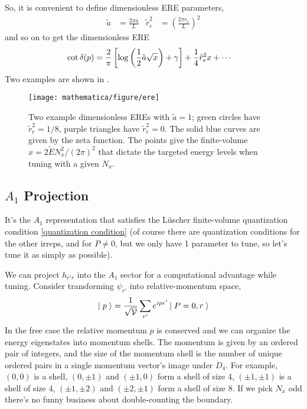 So, it is convenient to define dimensionless ERE parameters,
\begin{align}
    \tilde{a} &= \frac{2 \pi a}{L}
    &
    \tilde{r}_e^2 &= \left(\frac{2 \pi r_e}{L}\right)^2
\end{align}
and so on to get the dimensionless ERE
\begin{align}
    \cot \delta(p)
    &=
	\frac{2}{\pi}\left[ \log\left(\frac{1}{2} \tilde{a} \sqrt{x}\right)+ \gamma\right]
    +
	\frac{1}{4} \tilde{r}_e^2 x
    +
    \cdots
    \label{eq:ere dimensionless}
\end{align}
Two examples are shown in .

\begin{figure}
	\texttt{[image: mathematica/figure/ere]}
	\caption{
		Two example dimensionless EREs with $\tilde{a}=1$; green circles have $\tilde{r}_e^2=1/8$, purple triangles have $\tilde{r}_e^2=0$.
		The solid blue curves are given by the zeta function.
		The points give the finite-volume $x = 2 \tilde{E} N_x^2 / (2\pi)^2$ that dictate the targeted energy levels when tuning with a given $N_x$.
	}
	\label{fig:ere tuning}
\end{figure}

\subsection{$A_1$ Projection}

It's the $A_1$ representation that satisfies the L\"{u}scher finite-volume quantization condition \eqref{quantization condition} (of course there are quantization conditions for the other irreps, and for $P\neq 0$, but we only have 1 parameter to tune, so let's tune it as simply as possible).

We can project $h_{r'r}$ into the $A_1$ sector for a computational advantage while tuning.
Consider transforming $\psi_{r'}$ into relative-momentum space,
\begin{align}
    \left|\;p\;\right\rangle = \frac{1}{\sqrt{\mathcal{V}}}\sum_{r'} e^{ipr'} \left|\;P=0, r\;\right\rangle
\end{align}
In the free case the relative momentum $p$ is conserved and we can organize the energy eigenstates into momentum shells.
The momentum is given by an ordered pair of integers, and the size of the momentum shell is the number of unique ordered pairs in a single momentum vector's image under $D_4$.
For example, $(0,0)$ is a shell, $(0,\pm 1)$ and $(\pm 1, 0)$ form a shell of size 4, $(\pm 1, \pm 1)$ is a shell of size 4, $(\pm 1, \pm 2)$ and $(\pm 2, \pm 1)$ form a shell of size 8.
If we pick $N_x$ odd there's no funny business about double-counting the boundary.

